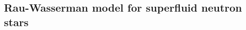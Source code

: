 \documentclass[a4paper, amsfonts, amssymb, amsmath, reprint, showkeys, nofootinbib, twoside, onecolumn,notitlepage]{revtex4-1}
\newcommand{\spc}{\quad \quad \quad}
\theoremstyle{definition}
\theoremstyle{theorem}
\begin{document}



\subsection{Rau-Wasserman model for superfluid neutron stars}
\end{document}
